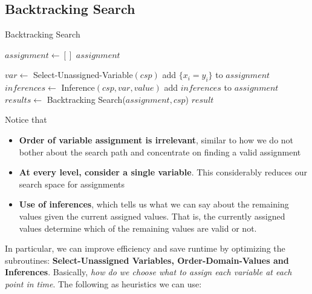 \documentclass[12pt]{article}
\begin{document}
\subsection{Backtracking Search}
\begin{algorithm}
\caption{Backtracking Search}\label{euclid}
\begin{algorithmic}[1]
\State $assignment \leftarrow []$
\State {} 
	\Return $assignment$
\EndIf

\State $var \leftarrow$ Select-Unassigned-Variable$(csp)$
\State add $\{ x_i = y_i\}$ to $assignment$
\State $inferences \leftarrow$ Inference$(csp, var, value)$
\State add $inferences$ to $assignment$
\State $results \leftarrow$ Backtracking Search($assignment, csp$)
\Return $result$
\EndIf
\EndIf
\EndIf
\EndFor
\EndWhile
\end{algorithmic}
\end{algorithm}

Notice that 
\begin{itemize}
\item \textbf{Order of variable assignment is irrelevant}, similar to how we do not bother about the search path and concentrate on finding a valid assignment
\item \textbf{At every level, consider a single variable}. This considerably reduces our search space for assignments
\item \textbf{Use of inferences}, which tells us what we can say about the remaining values given the current assigned values. That is, the currently assigned values determine which of the remaining values are valid or not.
\end{itemize}

In particular, we can improve efficiency and save runtime by optimizing the subroutines: \textbf{Select-Unassigned Variables, Order-Domain-Values and Inferences}. Basically, \textit{how do we choose what to assign each variable at each point in time}. The following as heuristics we can use:
\end{document}
